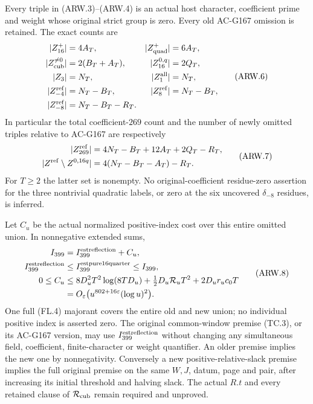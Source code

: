 \begin{theorem}
\label{AC-G169-window}
Every triple in (ARW.3)--(ARW.4) is an actual host character,
coefficient prime and weight whose original strict group is zero.
Every old AC-G167 omission is retained.  The exact counts are
\[
 \begin{aligned}
 |Z_{16}^+|&=4A_T,& |Z_{\rm quad}^+|&=6A_T,\\
 |Z_{\rm cub}^{\ne0}|&=2(B_T+A_T),&|Z_{16}^{0,q}|&=2Q_T,\\
 |Z_3|&=N_T,&|Z_1^{\rm all}|&=N_T,\\
 |Z_{-4}^{\rm ref}|&=N_T-B_T,&|Z_8^{\rm ref}|&=N_T-B_T,\\
 |Z_{-8}^{\rm ref}|&=N_T-B_T-R_T.
 \end{aligned}
 \tag{ARW.6}
\]
In particular the total coefficient-$269$ count and the number
of newly omitted triples relative to AC-G167 are respectively
\[
 \begin{aligned}
 |Z^{\rm ref}_{269}|&=4N_T-B_T+12A_T+2Q_T-R_T,\\
 |Z^{\rm ref}\setminus Z^{0,16q}|&=4(N_T-B_T-A_T)-R_T.
 \end{aligned}
 \tag{ARW.7}
\]
For $T\geq2$ the latter set is nonempty.
No original-coefficient residue-zero assertion for the three
nontrivial quadratic labels, or zero at the six uncovered
$\delta_{-8}$ residues, is inferred.

Let $C_u$ be the actual normalized positive-index cost over
this entire omitted union.  In nonnegative extended sums,
\[
 \begin{aligned}
 I_{399}&=I_{399}^{\rm estreflection}+C_u,\\
 I_{399}^{\rm estreflection}&\leq I_{399}^{\rm estpure16quarter}\leq I_{399},\\
 0\leq C_u&\leq8D_u^2T^2\log(8TD_u)
                +\tfrac12D_u\mathcal R_uT^2+2D_ur_uc_0T\\
 &=O_\varepsilon\bigl(u^{802+16\varepsilon}(\log u)^2\bigr).
 \end{aligned}
 \tag{ARW.8}
\]
One full (FL.4) majorant covers the entire old and new union;
no individual positive index is asserted zero.
The original common-window premise (TC.3), or its AC-G167
version, may use $I_{399}^{\rm estreflection}$ without changing
any simultaneous field, coefficient, finite-character or weight
quantifier.  An older premise implies the new one by nonnegativity.
Conversely a new positive-relative-slack premise implies the
full original premise on the same $W,J$, datum, page and pair,
after increasing its initial threshold and halving slack.
The actual $R.t$ and every retained clause of
$\mathcal R_{\rm cub}$ remain required and unproved.
\end{theorem}

